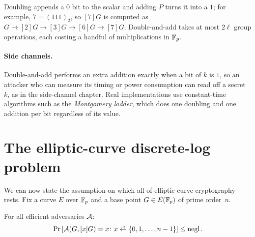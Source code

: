 Doubling appends a $0$ bit to the scalar and adding $P$ turns it into a
$1$; for example, $7 = (111)_2$, so $[7]G$ is computed as
$G \to [2]G \to [3]G \to [6]G \to [7]G$.
Double-and-add takes at most $2\ell$ group operations, each costing a
handful of multiplications in $\mathbb{F}_p$.

\paragraph{Side channels.}
Double-and-add performs an extra addition exactly when a bit of $k$ is
$1$, so an attacker who can measure its timing or power consumption can
read off a secret~$k$, as in the side-channel chapter.
Real implementations use constant-time algorithms such as the
\emph{Montgomery ladder}, which does one doubling and one addition per
bit regardless of its value.

\section{The elliptic-curve discrete-log problem}
\label{sec:ecdlp}

We can now state the assumption on which all of elliptic-curve
cryptography rests.
Fix a curve $E$ over $\mathbb{F}_p$ and a base point $G \in E(\mathbb{F}_p)$ of prime order~$n$.

\begin{definition}
For all efficient adversaries $\mathcal{A}$:
\[ \Pr\left[\calA(G, [x]G) = x \colon x \getsr \{0, 1, \dots, n-1\}\right]
   \leq \negl. \]
\end{definition}

